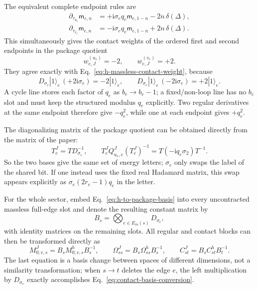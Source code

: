 \documentclass[11pt,a4paper]{article}
\newcommand{\ii}{\mathrm i}
\begin{document}
The equivalent complete endpoint rules are
\begin{align}
 \partial_{\tau_{u_e}}\mathsf m_{e,n}
 &=+\ii\sigma_eq_e\mathsf m_{e,1-n}-2n\,\delta(\Delta),\\
 \partial_{\tau_{v_e}}\mathsf m_{e,n}
 &=-\ii\sigma_eq_e\mathsf m_{e,1-n}+2n\,\delta(\Delta).
 \label{eq:package-massless-time-rules}
\end{align}
This simultaneously gives the contact weights of the ordered first and second endpoints in the package quotient
\begin{equation}
 w_{e,J}^{(u_e)}=-2,
 \qquad
 w_{e,J}^{(v_e)}=+2.
 \label{eq:package-massless-contact-weight}
\end{equation}
They agree exactly with Eq.~\eqref{eq:h-massless-contact-weight}, because
\begin{equation}
 D_{\sigma_e}|1\rangle_e\,(+2\ii\sigma_e)=-2|1\rangle_e,
 \qquad
 D_{\sigma_e}|1\rangle_e\,(-2\ii\sigma_e)=+2|1\rangle_e.
 \label{eq:contact-basis-conversion}
\end{equation}
A cycle line stores each factor of $q_e$ as $b_e\to b_e-1$; a fixed/non-loop line has no $b_e$ slot and must keep the structured modulus $q_e$ explicitly. Two regular derivatives at the same endpoint therefore give $-q_e^2$, while one at each endpoint gives $+q_e^2$.

The diagonalizing matrix of the package quotient can be obtained directly from the matrix of the paper:
\begin{equation}
 T_e^J=T D_{\sigma_e}^{-1},
 \qquad
 T_e^JQ^J_{u_e,e}(T_e^J)^{-1}
 =T(-\ii q_e\sigma_2)T^{-1}.
 \label{eq:package-diagonalizer}
\end{equation}
So the two bases give the same set of energy letters; $\sigma_e$ only swaps the label of the shared bit. If one instead uses the fixed real Hadamard matrix, this swap appears explicitly as $\sigma_e(2r_e-1)q_e$ in the letter.

For the whole sector, embed Eq.~\eqref{eq:h-to-package-basis} into every uncontracted massless full-edge slot and denote the resulting constant matrix by
\begin{equation}
 B_s=\bigotimes_{e\in E_m(s)}D_{\sigma_e},
 \label{eq:global-package-basis}
\end{equation}
with identity matrices on the remaining slots. All regular and contact blocks can then be transformed directly as
\begin{equation}
 M_{0;v,s}^{J}=B_sM_{0;v,s}^{h}B_s^{-1},
 \qquad
 \Omega_{ss}^{J}=B_s\Omega_{ss}^{h}B_s^{-1},
 \qquad
 C_{st}^{J}=B_sC_{st}^{h}B_t^{-1}.
 \label{eq:global-package-similarity}
\end{equation}
The last equation is a basis change between spaces of different dimensions, not a similarity transformation; when $s\to t$ deletes the edge $e$, the left multiplication by $D_{\sigma_e}$ exactly accomplishes Eq.~\eqref{eq:contact-basis-conversion}.
\end{document}
